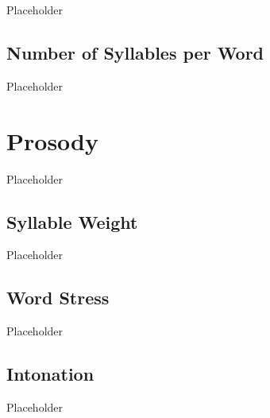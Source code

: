 Placeholder

\subsection{Number of Syllables per Word}
\label{subsec:rdk-num-syll}

Placeholder

\section{\langrdk{} Prosody}
\label{sec:rdk-prosody}

Placeholder

\subsection{Syllable Weight}
\label{subsec:rdk-syll-weight}

Placeholder

\subsection{Word Stress}
\label{subsec:rdk-word-stress}

Placeholder

\subsection{Intonation}
\label{subsec:rdk-intonation}

Placeholder
